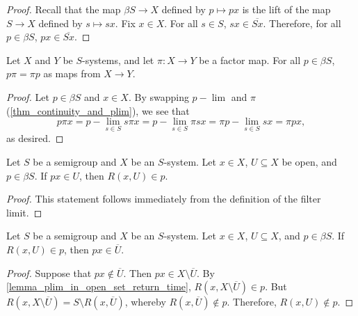 \begin{proof}
\leanok{}
    Recall that the map $\beta S \to X$ defined by $p \mapsto px$ is the lift of the map $S \to X$ defined by $s \mapsto sx$.  Fix $x \in X$.  For all $s \in S$, $sx \in \overline{Sx}$.  Therefore, for all $p \in \beta S$, $px \in \overline{Sx}$.
\end{proof}

\begin{theorem}
\label{thm_ultra_semigroup_action_thru_factor}
\leanok{}
    Let $X$ and $Y$ be $S$-systems, and let $\pi: X \to Y$ be a factor map.  For all $p \in \beta S$, $p \pi = \pi p$ as maps from $X \to Y$.
\end{theorem}

\begin{proof}
\leanok{}
    Let $p \in \beta S$ and $x \in X$.  By swapping $p-\lim$ and $\pi$ (\cref{thm_continuity_and_plim}), we see that
    \[p \pi x = p-\lim_{s \in S} s \pi x = p-\lim_{s \in S} \pi s x = \pi p-\lim_{s \in S} s x = \pi p x,\]
    as desired.
\end{proof}

\begin{theorem}
\label{lemma_plim_in_open_set_return_time}
\leanok{}
    Let $S$ be a semigroup and $X$ be an $S$-system.  Let $x \in X$, $U \subseteq X$ be open, and $p \in \beta S$.  If $px \in U$, then $R(x,U) \in p$.
\end{theorem}

\begin{proof}
    \leanok{}
    This statement follows immediately from the definition of the filter limit.
\end{proof}

\begin{theorem}
\label{lemma_return_time_implies_plim}
\leanok{}
    Let $S$ be a semigroup and $X$ be an $S$-system.  Let $x \in X$, $U \subseteq X$, and $p \in \beta S$.  If $R(x,U) \in p$, then $px \in \overline{U}$.
\end{theorem}

\begin{proof}
\leanok{}
    Suppose that $px \not\in \overline{U}$.  Then $px \in X \setminus \overline{U}$. By \cref{lemma_plim_in_open_set_return_time}, $R(x,X \setminus \overline{U}) \in p$.  But $R(x,X \setminus \overline{U}) = S \setminus R(x, \overline{U})$, whereby $R(x, \overline{U}) \not\in p$. Therefore, $R(x,U) \not\in p$.
\end{proof}


